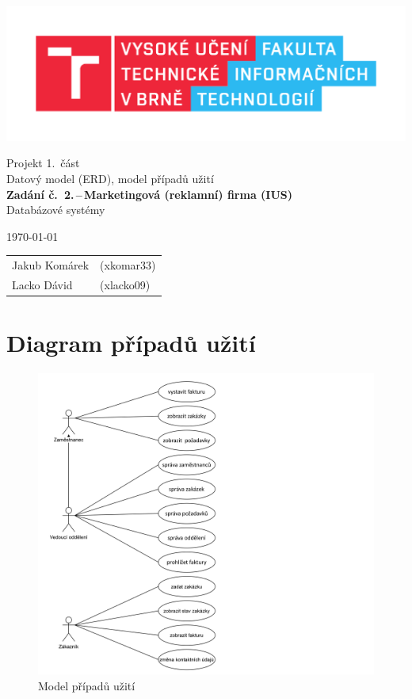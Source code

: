\documentclass[11pt, a4paper]{article}
\begin{document}
	\begin{titlepage}
		\begin{center}
			\includegraphics[width=0.77 \linewidth]{FIT_logo.pdf} \\


			\Huge{Projekt 1.~část} \\
			\Huge{Datový model (ERD), model případů užití} \\
			\LARGE{\textbf{Zadání č.~2.\,--\,Marketingová (reklamní) firma (IUS)}} \\
			\Large{Databázové systémy}

		\end{center}

		{\Large
			\today
			\hfill
			\begin{tabular}{l l}
				Jakub Komárek & (xkomar33) \\
				Lacko Dávid & (xlacko09) \\
			\end{tabular}
		}
	\end{titlepage}
    \section{Diagram případů užití}
    
	\begin{figure}[ht]
		\centering
		\includegraphics[width=1 \linewidth]{use_case_diagram.png}
		\caption{Model případů užití}
	\end{figure}
\end{document}

